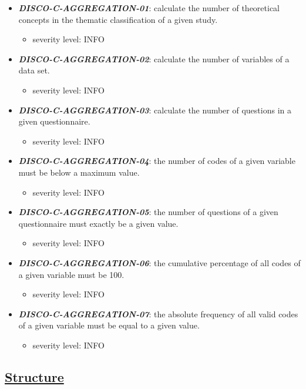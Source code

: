 \documentclass{llncs}
\begin{document}
\begin{itemize}
	\item \textbf{{\em DISCO-C-AGGREGATION-01}}: calculate the number of theoretical concepts in the thematic classification of a given study.
	\begin{itemize}
		\item severity level: INFO
	\end{itemize}
  \item \textbf{{\em DISCO-C-AGGREGATION-02}}: calculate the number of variables of a data set.
	\begin{itemize}
		\item severity level: INFO
	\end{itemize}
	\item \textbf{{\em DISCO-C-AGGREGATION-03}}: calculate the number of questions in a given questionnaire.
	\begin{itemize}
		\item severity level: INFO
	\end{itemize}
	\item \textbf{{\em DISCO-C-AGGREGATION-04}}: the number of codes of a given variable must be below a maximum value.
	\begin{itemize}
		\item severity level: INFO
	\end{itemize}
	\item \textbf{{\em DISCO-C-AGGREGATION-05}}: the number of questions of a given questionnaire must exactly be a given value.
	\begin{itemize}
		\item severity level: INFO
	\end{itemize}
	\item \textbf{{\em DISCO-C-AGGREGATION-06}}: the cumulative percentage of all codes of a given variable must be 100.
	\begin{itemize}
		\item severity level: INFO
	\end{itemize}
  \item \textbf{{\em DISCO-C-AGGREGATION-07}}: the absolute frequency of all valid codes of a given variable must be equal to a given value.
	\begin{itemize}
		\item severity level: INFO
	\end{itemize}
\end{itemize} 

\subsection{\underline{Structure}}
\end{document}
